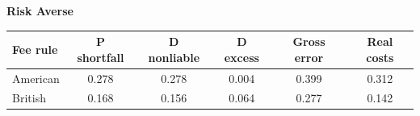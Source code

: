 \documentclass[10pt,border=5pt,varwidth=17cm]{standalone}
\begin{document}
\begingroup
\small
\setlength{\tabcolsep}{5pt}
\renewcommand{\arraystretch}{1.20}
\noindent\textbf{Risk Averse}\par\smallskip
\noindent\begin{tabularx}{\linewidth}{@{}>{\raggedright\arraybackslash}Xccccc@{}}
\toprule
\textbf{Fee rule} & \textbf{P shortfall} & \textbf{D nonliable} & \textbf{D excess} & \textbf{Gross error} & \textbf{Real costs} \\
\midrule
American & 0.278 & 0.278 & 0.004 & 0.399 & 0.312 \\
British & 0.168 & 0.156 & 0.064 & 0.277 & 0.142 \\
\bottomrule\end{tabularx}\par\medskip
\endgroup
\end{document}
